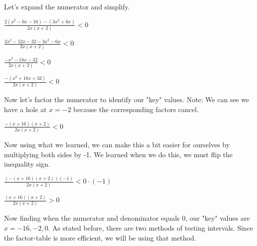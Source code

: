 \documentclass[12pt,fleqn]{book} %
\begin{document}
\noindent Let's expand the numerator and simplify.

\begin{center}
    \LARGE{$\frac{2(x^2-6x-16)-(3x^2+6x)}{2x(x+2)} < 0$}
\end{center}

\begin{center}
    \LARGE{$\frac{2x^2-12x-32-3x^2-6x}{2x(x+2)} < 0$}
\end{center}

\begin{center}
    \LARGE{$\frac{-x^2-18x-32}{2x(x+2)} < 0$}
\end{center}

\begin{center}
    \LARGE{$\frac{-(x^2+18x+32)}{2x(x+2)} < 0$}
\end{center}

\noindent Now let's factor the numerator to identify our "key" values. Note: We can see we have a hole at $x=-2$ because the corresponding factors cancel. 

\begin{center}
    \LARGE{$\frac{-(x+16)(x+2)}{2x(x+2)} < 0$}
\end{center}

\noindent Now using what we learned, we can make this a bit easier for ourselves by multiplying both sides by -1. We learned when we do this, we must flip the inequality sign.

\begin{center}
    \LARGE{$\frac{(-(x+16)(x+2))(-1)}{2x(x+2)} < 0\cdot(-1)$}
\end{center}

\begin{center}
    \LARGE{$\frac{(x+16)(x+2)}{2x(x+2)} > 0$}
\end{center}

\noindent Now finding when the numerator and denominator equals 0, our "key" values are $x=-16,-2,0$. As stated before, there are two methods of testing intervals. Since the factor-table is more efficient, we will be using that method.
\end{document}
